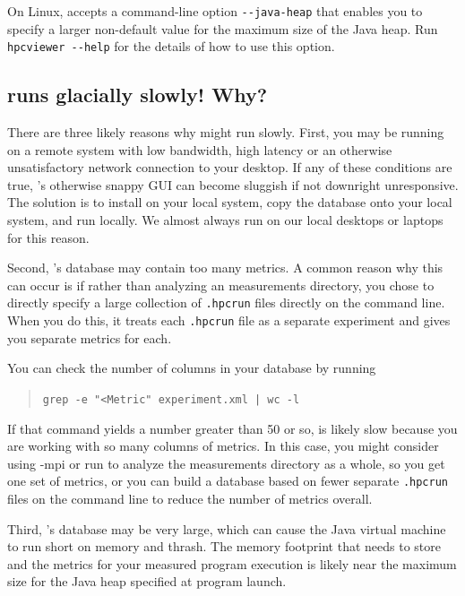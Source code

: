 \documentclass[11pt,twoside,letterpaper]{report}
\begin{document}
On Linux, \hpcviewer{} accepts a command-line option \verb|--java-heap| that enables you to specify a larger non-default value for the maximum size of the Java heap. Run \verb|hpcviewer --help| for the details of how to use this option.



\subsection{\hpcviewer{} runs glacially slowly! Why?}

There are three likely reasons why \hpcviewer{} might run slowly.
First, you may be running \hpcviewer{} on a remote system with low bandwidth, high latency or an otherwise unsatisfactory network connection to your desktop.
If any of these conditions are true, \hpcviewer{}'s otherwise snappy GUI can become sluggish if not downright unresponsive.
The solution is to install \hpcviewer{} on your local system, copy the database onto your local system, and run \hpcviewer{} locally.
We almost always run \hpcviewer{} on our local desktops or laptops for this reason.

Second, \HPCToolkit{}'s database may contain too many metrics.
A common reason why this can occur is if rather than analyzing an \HPCToolkit{}  measurements directory, you chose to directly specify a large collection of {\tt .hpcrun} files directly on the command line. When you do this, it treats each {\tt .hpcrun} file as a separate experiment and gives you separate metrics for each.

You can check the number of columns in your database by running
\begin{quote}
  \verb,grep -e "<Metric" experiment.xml | wc -l,
\end{quote}
If that command yields a number greater than 50 or so, \hpcviewer{} is likely slow because you are working with so many columns of metrics. In this case, you might consider using  \hpcprof-mpi{} or run \hpcprof{} to analyze the measurements directory as a whole, so you get one set of metrics, or you can build a database based on fewer separate {\tt .hpcrun} files on the command line to reduce the number of metrics overall.

Third, \HPCToolkit{}'s database may be very large, which can cause the Java virtual machine to run short on memory and thrash. The memory footprint that \hpcviewer{} needs to store and the metrics for your measured program execution is likely near the maximum size for the Java heap specified at program launch.
\end{document}
